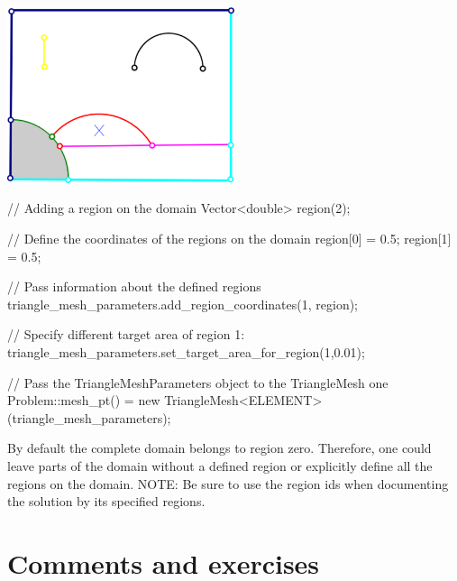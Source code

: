  
\begin{DoxyImage}
\includegraphics[width=0.50\textwidth]{sketch_domain_hole_region}
\end{DoxyImage}


 
\begin{DoxyCodeInclude}
  \textcolor{comment}{// Adding a region on the domain}
  Vector<double> region(2);

  \textcolor{comment}{// Define the coordinates of the regions on the domain}
  region[0] = 0.5;
  region[1] = 0.5;

  \textcolor{comment}{// Pass information about the defined regions}
  triangle\_mesh\_parameters.add\_region\_coordinates(1, region);
  
  \textcolor{comment}{// Specify different target area of region 1:}
  triangle\_mesh\_parameters.set\_target\_area\_for\_region(1,0.01);

  \textcolor{comment}{// Pass the TriangleMeshParameters object to the TriangleMesh one}
  Problem::mesh\_pt() = \textcolor{keyword}{new} TriangleMesh<ELEMENT>(triangle\_mesh\_parameters);

\end{DoxyCodeInclude}


By default the complete domain belongs to region zero. Therefore, one could leave parts of the domain without a defined region or explicitly define all the regions on the domain. N\+O\+TE\+: Be sure to use the region ids when documenting the solution by its specified regions.



 

\hypertarget{index_ex}{}\section{Comments and exercises}\label{index_ex}

